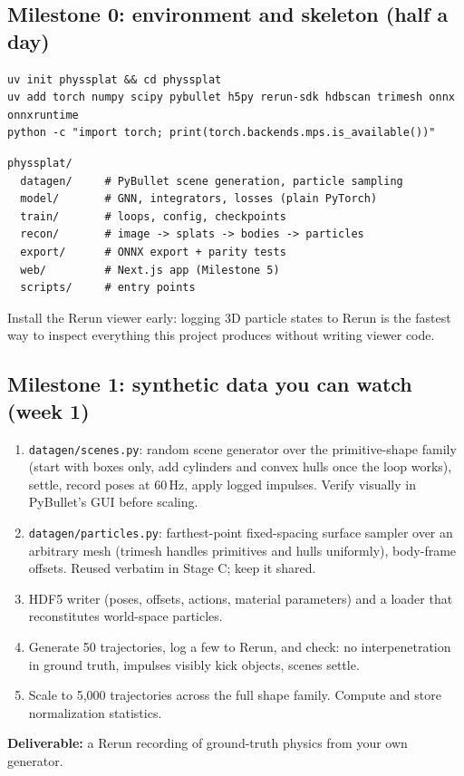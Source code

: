 \documentclass[11pt]{article}
\begin{document}
\subsection{Milestone 0: environment and skeleton (half a day)}
\begin{lstlisting}
uv init physsplat && cd physsplat
uv add torch numpy scipy pybullet h5py rerun-sdk hdbscan trimesh onnx onnxruntime
python -c "import torch; print(torch.backends.mps.is_available())"
\end{lstlisting}
\begin{lstlisting}
physsplat/
  datagen/     # PyBullet scene generation, particle sampling
  model/       # GNN, integrators, losses (plain PyTorch)
  train/       # loops, config, checkpoints
  recon/       # image -> splats -> bodies -> particles
  export/      # ONNX export + parity tests
  web/         # Next.js app (Milestone 5)
  scripts/     # entry points
\end{lstlisting}
Install the Rerun viewer early: logging 3D particle states to Rerun is the fastest way to inspect everything this project produces without writing viewer code.

\subsection{Milestone 1: synthetic data you can watch (week 1)}
\begin{enumerate}[itemsep=2pt]
  \item \texttt{datagen/scenes.py}: random scene generator over the primitive-shape family (start with boxes only, add cylinders and convex hulls once the loop works), settle, record poses at 60\,Hz, apply logged impulses. Verify visually in PyBullet's GUI before scaling.
  \item \texttt{datagen/particles.py}: farthest-point fixed-spacing surface sampler over an arbitrary mesh (trimesh handles primitives and hulls uniformly), body-frame offsets. Reused verbatim in Stage C; keep it shared.
  \item HDF5 writer (poses, offsets, actions, material parameters) and a loader that reconstitutes world-space particles.
  \item Generate 50 trajectories, log a few to Rerun, and check: no interpenetration in ground truth, impulses visibly kick objects, scenes settle.
  \item Scale to 5{,}000 trajectories across the full shape family. Compute and store normalization statistics.
\end{enumerate}
\textbf{Deliverable:} a Rerun recording of ground-truth physics from your own generator.
\end{document}
